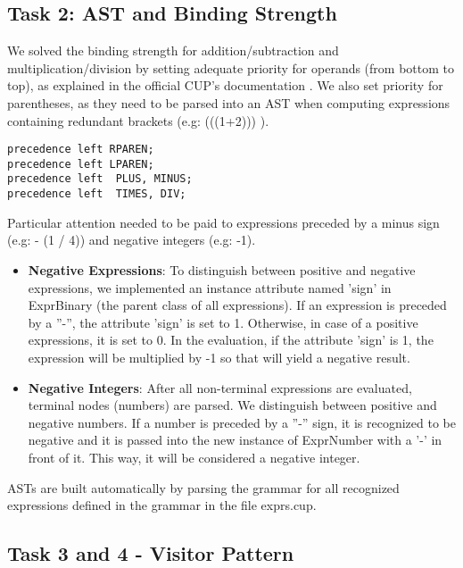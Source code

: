 \documentclass[paper=a4, fontsize=11pt]{scrartcl}
\numberwithin{equation}{section}		%
\numberwithin{figure}{section}			%
\numberwithin{table}{section}				%
\begin{document}
\subsection*{Task 2: AST and Binding Strength}
\label{Task2}
We solved the binding strength for addition/subtraction and multiplication/division by setting adequate priority for operands (from bottom to top), as explained in the official CUP's documentation \cite{key01}. We also set priority for parentheses, as they need to be parsed into an AST when computing expressions containing redundant brackets (e.g: (((1+2))) ).

\begin{lstlisting}
precedence left RPAREN;
precedence left LPAREN;
precedence left  PLUS, MINUS;
precedence left  TIMES, DIV;
\end{lstlisting}

Particular attention needed to be paid to expressions preceded by a minus sign (e.g: - (1 / 4)) and negative integers (e.g: -1).
\begin{itemize}
	\item \textbf{Negative Expressions}: To distinguish between positive and negative expressions, we implemented an instance attribute named 'sign' in ExprBinary (the parent class of all expressions).
If an expression is preceded by a ''-'', the attribute 'sign' is set to 1. Otherwise, in case of a positive expressions, it is set to 0. In the evaluation, if the attribute 'sign' is 1, the expression will be multiplied by -1 so that will yield a negative result.  
	\item \textbf{Negative Integers}: After all non-terminal expressions are evaluated, terminal nodes (numbers) are parsed. We distinguish between positive and negative numbers. If a number is preceded by a ''-'' sign, it is recognized to be negative and it is passed into the new instance of ExprNumber with a '-' in front of it. This way, it will be considered a negative integer.
\end{itemize}
ASTs are built automatically by parsing the grammar for all recognized expressions defined in the grammar in the file exprs.cup.

\subsection*{Task 3 and 4 - Visitor Pattern}
\end{document}
